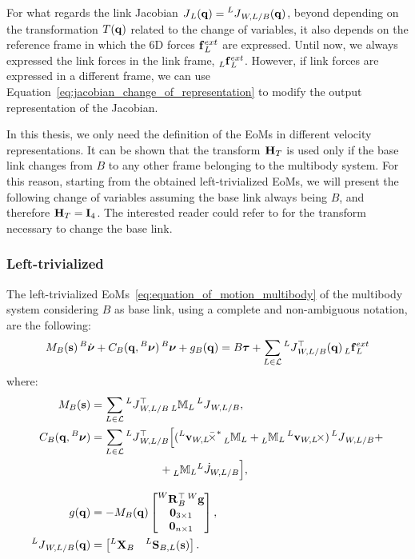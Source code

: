 \begin{remark}
%
For what regards the link Jacobian $\jac_L(\Qu) = \jac[L]_{W,L/B}(\Qu)$, beyond depending on the transformation $T(\Qu)$ related to the change of variables, it also depends on the reference frame in which the 6D forces $\forcesix^{ext}_L$ are expressed.
Until now, we always expressed the link forces in the link frame, \ie $\forcesix[L]^{ext}_L$.
However, if link forces are expressed in a different frame, we can use Equation~\eqref{eq:jacobian_change_of_representation} to modify the output representation of the Jacobian.
%
\end{remark}

In this thesis, we only need the definition of the \acp{EoM} in different velocity representations.
It can be shown that the transform $\homo_T$ is used only if the base link changes from $B$ to any other frame belonging to the multibody system.
For this reason, starting from the obtained left-trivialized \acp{EoM}, we will present the following change of variables assuming the base link always being $B$, and therefore $\homo_T = \eye_4$.
The interested reader could refer to \parencite{traversaro_modelling_2017} for the transform necessary to change the base link.

\subsubsection{Left-trivialized}

The left-trivialized \acp{EoM}~\eqref{eq:equation_of_motion_multibody} of the multibody system considering $B$ as base link, using a complete and non-ambiguous notation, are the following:
%
\begin{equation*}
    M_B(\Shape) \Nud[B] + C_B(\Qu, \Nu[B]) \Nu[B] + g_B(\Qu) = B \Torques + \sum_{L \in \mathcal{L}} \jac[L]_{W,L/B}^\top(\Qu) \forcesix[L]_L^{ext} 
\end{equation*}
%
where:
%
\begin{align*}
    M_B(\Shape) &= \sum_{L\in\mathcal{L}} \jac[L]_{W,L/B}^\top \masssix[L]_L \jac[L]_{W,L/B} ,\\
    C_B(\Qu, \Nu[B]) &= \sum_{L\in\mathcal{L}} \jac[L]_{W,L/B}^\top \Big[ (\crossforsix[{\velsix[L]_{W,L}}] \masssix[L]_L + \masssix[L]_L \crossvelsix[{\velsix[L]_{W,L}}]) \jac[L]_{W,L/B} + \\
    &\phantom{\sum_{L\in\mathcal{L}} \jac[L]_{W,L/B}^\top \Big[} + \masssix[L]_L {}^L\dot{J}_{W,L/B} \Big] ,\\
    g(\Qu) &= -M_B(\Qu) \begin{bmatrix}\rot[W]_B^\top \gravity[W] \\ \zeros_{3\times1} \\ \zeros_{n\times1}\end{bmatrix} ,\\
    \jac[L]_{W,L/B}(\Qu) &= 
    \begin{bmatrix}
        \transvel[L]_B & \subspacee[L]_{B,L}(\Shape)
    \end{bmatrix}
    .
\end{align*}


